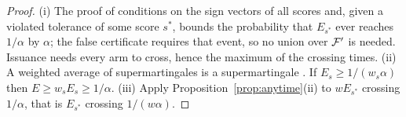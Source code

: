 \begin{proof}
(i) The proof of \cite[Thm.~2]{dang2026vouch} conditions on the sign vectors of all scores and, given a
violated tolerance of some score $s^\ast$, bounds the probability that $E_{s^\ast}$ ever
reaches $1/\alpha$ by $\alpha$; the false certificate requires that event, so no union
over $\mathcal{F}'$ is needed. Issuance needs every arm to cross, hence the maximum of the crossing
times. (ii) A weighted average of supermartingales is a supermartingale
\citep[the merging of e-values by averaging;][]{vovk2021evalues}. If
$E_s\ge1/(w_s\alpha)$ then $E\ge w_sE_s\ge1/\alpha$. (iii) Apply
Proposition~\ref{prop:anytime}(ii) to $w E_{s^\ast}$ crossing $1/\alpha$, that is
$E_{s^\ast}$ crossing $1/(w\alpha)$.
\end{proof}